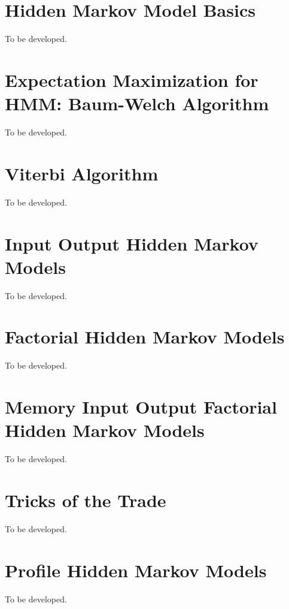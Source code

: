 \documentclass[11pt, oneside]{book}
\let\originalsection\section
\renewcommand{\section}{\Needspace{7\baselineskip}\originalsection}
\begin{document}
\section{Hidden Markov Model Basics}\label{sec:source-11-2}
{\small\color{gray!70!black} To be developed.}

\section{Expectation Maximization for HMM: Baum-Welch Algorithm}\label{sec:source-11-3}
{\small\color{gray!70!black} To be developed.}

\section{Viterbi Algorithm}\label{sec:source-11-4}
{\small\color{gray!70!black} To be developed.}

\section{Input Output Hidden Markov Models}\label{sec:source-11-5}
{\small\color{gray!70!black} To be developed.}

\section{Factorial Hidden Markov Models}\label{sec:source-11-6}
{\small\color{gray!70!black} To be developed.}

\section{Memory Input Output Factorial Hidden Markov Models}\label{sec:source-11-7}
{\small\color{gray!70!black} To be developed.}

\section{Tricks of the Trade}\label{sec:source-11-8}
{\small\color{gray!70!black} To be developed.}

\section{Profile Hidden Markov Models}\label{sec:source-11-9}
{\small\color{gray!70!black} To be developed.}
\end{document}
